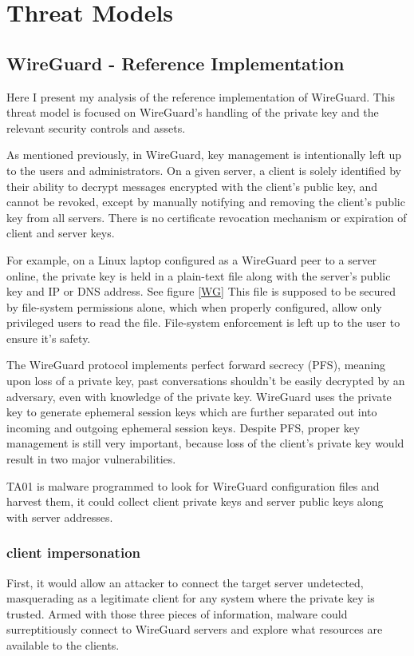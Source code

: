 \documentclass [11pt, proquest] {uwthesis}[2020/02/24]
\begin{document}
\chapter {Threat Models}
\label{section:tm}

\section {WireGuard - Reference Implementation}

Here I present my analysis of the reference implementation of WireGuard. This threat model is focused on WireGuard's handling of the private key and the relevant security controls and assets.

As mentioned previously, in WireGuard, key management is intentionally left up to the users and administrators. On a given server, a client is solely identified by their ability to decrypt messages encrypted with the client's public key, and cannot be revoked, except by manually notifying and removing the client’s public key from all servers. There is no certificate revocation mechanism or expiration of client and server keys.

For example, on a Linux laptop configured as a WireGuard peer to a server online, the private key is held in a plain-text file along with the server’s public key and IP or DNS address. See figure \ref{WG}
This file is supposed to be secured by file-system permissions alone, which when properly configured, allow only privileged users to read the file. File-system enforcement is left up to the user to ensure it's safety. 

The WireGuard protocol implements perfect forward secrecy (PFS), meaning upon loss of a private key, past conversations shouldn't be easily decrypted by an adversary, even with knowledge of the private key. WireGuard uses the private key to generate ephemeral session keys which are further separated out into incoming and outgoing ephemeral session keys.
Despite PFS, proper key management is still very important, because loss of the client’s private key would result in two major vulnerabilities. 

TA01 is malware programmed to look for WireGuard configuration files and harvest them, it could collect client private keys and server public keys along with server addresses.

\subsection{client impersonation}
First, it would allow an attacker to connect the target server undetected, masquerading as a legitimate client for any system where the private key is trusted. 
Armed with those three pieces of information, malware could surreptitiously connect to WireGuard servers and explore what resources are available to the clients.
\end{document}
